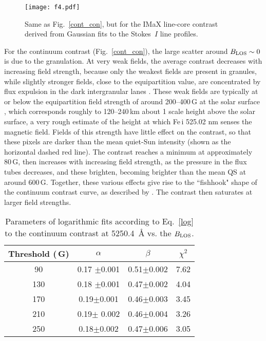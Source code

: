 \documentclass[goettingen, gauss, print]{thesis}
\begin{document}
\begin{figure}
\centering
\texttt{[image: f4.pdf]}
\caption{Same as Fig.~\ref{cont_con}, but for the IMaX line-core contrast derived from Gaussian fits to the Stokes~$I$ line profiles.}
\label{lc_con}
\end{figure}

For the continuum contrast (Fig.~\ref{cont_con}), the large scatter around $B_{\rm LOS} \sim 0$ is due to the granulation. At very weak fields, the average contrast decreases with increasing field strength, because only the weakest fields are present in granules, while slightly stronger fields, close to the equipartition value, are concentrated by flux expulsion in the dark intergranular lanes \citep{parker_kinematical_1963}. These weak fields are typically at or below the equipartition field strength of around 200--400\,G at the solar surface \citep[e.g.,][]{solanki_solar_1996}, which corresponds roughly to 120--240\,km about 1 scale height above the solar surface, a very rough estimate of the height at which Fe\,{\sc i} 525.02 nm senses the magnetic field. Fields of this strength have little effect on the contrast, so that these pixels are darker than the mean quiet-Sun intensity (shown as the horizontal dashed red line). The contrast reaches a minimum at approximately 80\,G, then increases with increasing field strength, as the pressure in the flux tubes decreases, and these brighten, becoming brighter than the mean QS at around 600\,G. Together, these various effects give rise to the ``fishhook" shape of the continuum contrast curve, as described by \cite{schnerr_brightness_2011}. The contrast then saturates at larger field strengths.

\begin{table}[h!]
\centering
\begin{tabular}{||cccc||}
\hline
Threshold (\,G) & $\alpha$  & $\beta$ & $\chi^2$ \\
\hline\hline
90 &0.17 $\pm$0.001 & 0.51$\pm$0.002 & 7.62 \\
130 & 0.18 $\pm$0.001&0.47$\pm$0.002&4.04\\
170 & 0.19$\pm$0.001&0.46$\pm$0.003&3.45\\
210 & 0.19$\pm$ 0.002&0.46$\pm$0.004&3.26\\
250 & 0.18$\pm$0.002&0.47$\pm$0.006&3.05\\
 \hline
\end{tabular}
\caption{Parameters of logarithmic fits according to Eq.~\ref{log} to the continuum contrast at 5250.4\, \AA{} vs. the $B_{\rm LOS}$.}
\label{cont_log}
\end{table}
\end{document}
